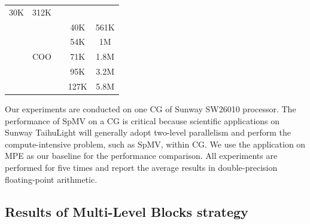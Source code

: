 \documentclass[5p,times]{elsarticle}
\begin{document}
\begin{table}[]
\begin{tabular}{|c|c|c|c|c|}
                     30K &312K                         \\ \cline{2-2} \cline{4-5}
                     & \multirow{5}{*}{COO}                        &             & 40K &561K                         \\ \cline{4-5}
                     &                                             &             & 54K &1M                         \\ \cline{4-5}
                     &                                             &             & 71K &1.8M                         \\ \cline{4-5}
                     &                                             &             & 95K &3.2M                         \\ \cline{4-5}
                     &                      &                         &
                     127K &5.8M                         \\ \hline
\end{tabular}
\label{expDetail}
\end{table}

Our experiments are conducted on one CG of Sunway SW26010 processor. The performance of SpMV on a CG is critical because scientific applications on Sunway TaihuLight will generally adopt two-level parallelism and perform the compute-intensive problem, such as SpMV, within CG. We use the application on MPE as our baseline for the performance comparison. All experiments are performed for five times and report the average results in double-precision floating-point arithmetic.

\subsection{Results of Multi-Level Blocks strategy}
\end{document}
